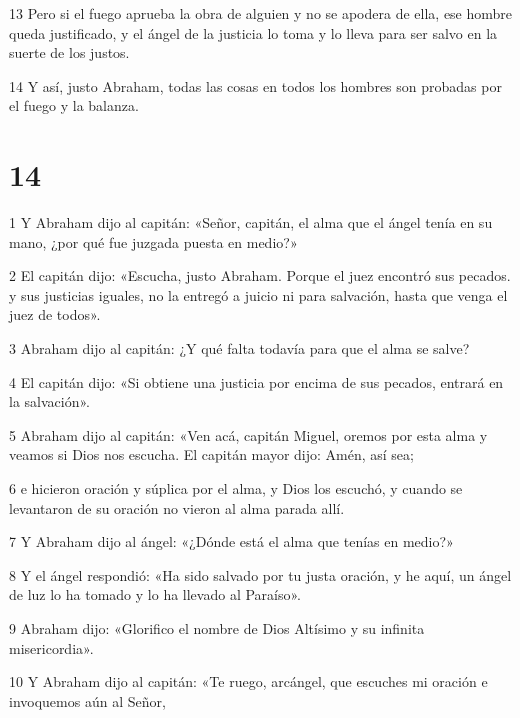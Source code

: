 \par 13 Pero si el fuego aprueba la obra de alguien y no se apodera de ella, ese hombre queda justificado, y el ángel de la justicia lo toma y lo lleva para ser salvo en la suerte de los justos.

\par 14 Y así, justo Abraham, todas las cosas en todos los hombres son probadas por el fuego y la balanza.

\chapter{14}

\par 1 Y Abraham dijo al capitán: «Señor, capitán, el alma que el ángel tenía en su mano, ¿por qué fue juzgada puesta en medio?»

\par 2 El capitán dijo: «Escucha, justo Abraham. Porque el juez encontró sus pecados. y sus justicias iguales, no la entregó a juicio ni para salvación, hasta que venga el juez de todos».

\par 3 Abraham dijo al capitán: ¿Y qué falta todavía para que el alma se salve?

\par 4 El capitán dijo: «Si obtiene una justicia por encima de sus pecados, entrará en la salvación».

\par 5 Abraham dijo al capitán: «Ven acá, capitán Miguel, oremos por esta alma y veamos si Dios nos escucha. El capitán mayor dijo: Amén, así sea;

\par 6 e hicieron oración y súplica por el alma, y ​​Dios los escuchó, y cuando se levantaron de su oración no vieron al alma parada allí.

\par 7 Y Abraham dijo al ángel: «¿Dónde está el alma que tenías en medio?»

\par 8 Y el ángel respondió: «Ha sido salvado por tu justa oración, y he aquí, un ángel de luz lo ha tomado y lo ha llevado al Paraíso».

\par 9 Abraham dijo: «Glorifico el nombre de Dios Altísimo y su infinita misericordia».

\par 10 Y Abraham dijo al capitán: «Te ruego, arcángel, que escuches mi oración e invoquemos aún al Señor,

